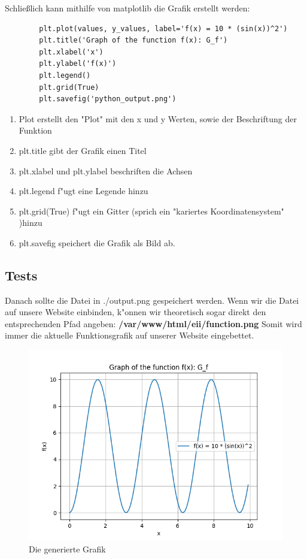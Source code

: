 \documentclass[a4paper,11pt,titlepage]{article}
\begin{document}
    Schließlich kann mithilfe von matplotlib die Grafik erstellt werden:
    \begin{lstlisting}
        plt.plot(values, y_values, label='f(x) = 10 * (sin(x))^2')
        plt.title('Graph of the function f(x): G_f')
        plt.xlabel('x')
        plt.ylabel('f(x)')
        plt.legend()
        plt.grid(True)
        plt.savefig('python_output.png')
    \end{lstlisting}
    \begin{enumerate}
        \item Plot erstellt den "Plot" mit den x und y Werten, sowie der Beschriftung der Funktion
        \item plt.title gibt der Grafik einen Titel
        \item plt.xlabel und plt.ylabel beschriften die Achsen
        \item plt.legend f"ugt eine Legende hinzu
        \item plt.grid(True) f"ugt ein Gitter (sprich ein "kariertes Koordinatensystem" )hinzu
        \item plt.savefig speichert die Grafik als Bild ab.
    \end{enumerate}

    \subsection{Tests}
    Danach sollte die Datei in ./output.png gespeichert werden. Wenn wir die Datei auf unsere Website einbinden, k"onnen wir theoretisch sogar direkt den entsprechenden Pfad angeben:
    \textbf{/var/www/html/eii/function.png}
    Somit wird immer die aktuelle Funktionsgrafik auf unserer Website eingebettet.

    \begin{figure}
        \centering
        \includegraphics{./images/function}
        \caption{Die generierte Grafik}
        \label{fig:function}
    \end{figure}
\end{document}
